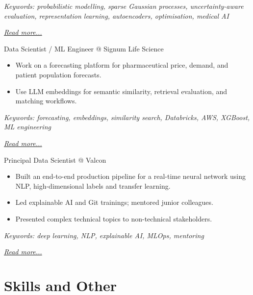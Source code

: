 \documentclass[11pt,a4paper]{moderncv}
\begin{document}
{\footnotesize\textit{Keywords: probabilistic modelling, sparse Gaussian processes, uncertainty-aware evaluation, representation learning, autoencoders, optimisation, medical AI}}

\hfill{\small{\textit{\hyperref[sec:raysearch]{Read more...}}}}

\large{Data Scientist / ML Engineer @ Signum Life Science}
\normalsize
\begin{itemize}
\item Work on a forecasting platform for pharmaceutical price, demand, and patient population forecasts.
\item Use LLM embeddings for semantic similarity, retrieval evaluation, and matching workflows.
\end{itemize}

{\footnotesize\textit{Keywords: forecasting, embeddings, similarity search, Databricks, AWS, XGBoost, ML engineering}}

\hfill{\small{\textit{\hyperref[sec:signum]{Read more...}}}}

\large{Principal Data Scientist @ Valcon}
\normalsize
\begin{itemize}
\item Built an end-to-end production pipeline for a real-time neural network using NLP, high-dimensional labels and transfer learning.
\item Led explainable AI and Git trainings; mentored junior colleagues.
\item Presented complex technical topics to non-technical stakeholders.
\end{itemize}

{\footnotesize\textit{Keywords: deep learning, NLP, explainable AI, MLOps, mentoring}}

\hfill{\small{\textit{\hyperref[sec:valcon]{Read more...}}}}

\section{Skills and Other}
\normalsize
{}
\end{document}
